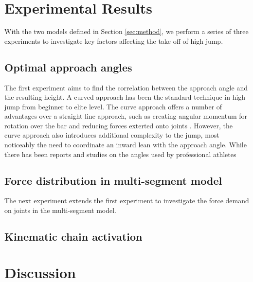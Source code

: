 \documentclass[twocolumn]{aastex631}
\begin{document}
\section{Experimental Results}
\label{sec:results}

With the two models defined in Section \ref{sec:method}, we perform a series of three experiments to investigate key factors affecting the take off of high jump.

\subsection{Optimal approach angles}

The first experiment aims to find the correlation between the approach angle and the resulting height.
A curved approach has been the standard technique in high jump from beginner to elite level. The curve approach offers a number of advantages over a straight line approach, such as creating angular momentum for rotation over the bar and reducing forces exterted onto joints \cite{Tan1997TheMO, Tan01012005, Sado2021CurvedAI}.
However, the curve approach also introduces additional complexity to the jump, most noticeably the need to coordinate an inward lean with the approach angle.
While there has been reports and studies on the angles used by professional athletes \cite{Nicholson2024DifferencesIR}

\subsection{Force distribution in multi-segment model}

The next experiment extends the first experiment to investigate the force demand on joints in the multi-segment model.


\subsection{Kinematic chain activation}

\section{Discussion}
\label{sec:discussion}





\end{document}
